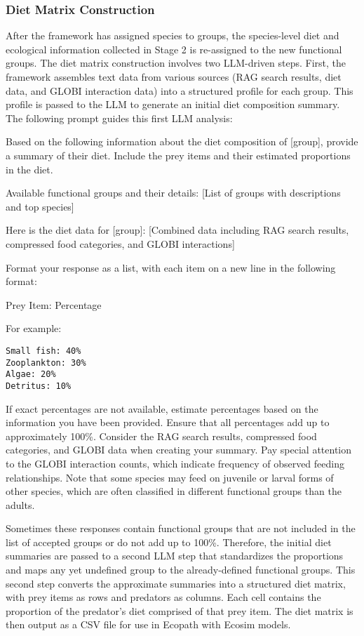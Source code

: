 \subsubsection{Diet Matrix Construction}

After the framework has assigned species to groups, the species-level diet and ecological information collected in Stage 2 is re-assigned to the new functional groups. The diet matrix construction involves two LLM-driven steps. First, the framework assembles text data from various sources (RAG search results, diet data, and GLOBI interaction data) into a structured profile for each group. This profile is passed to the LLM to generate an initial diet composition summary. The following prompt guides this first LLM analysis:

\begin{prompt}
Based on the following information about the diet composition of [group], provide a summary of their diet. Include the prey items and their estimated proportions in the diet.

Available functional groups and their details:
[List of groups with descriptions and top species]

Here is the diet data for [group]:
[Combined data including RAG search results, compressed food categories, and GLOBI interactions]

Format your response as a list, with each item on a new line in the following format:

Prey Item: Percentage

For example:
\begin{verbatim}
Small fish: 40%
Zooplankton: 30%
Algae: 20%
Detritus: 10%
\end{verbatim}

If exact percentages are not available, estimate percentages based on the information you have been provided.
Ensure that all percentages add up to approximately 100\%.
Consider the RAG search results, compressed food categories, and GLOBI data when creating your summary.
Pay special attention to the GLOBI interaction counts, which indicate frequency of observed feeding relationships.
Note that some species may feed on juvenile or larval forms of other species, which are often classified in different functional groups than the adults.
\end{prompt}

Sometimes these responses contain functional groups that are not included in the list of accepted groups or do not add up to 100\%. Therefore, the initial diet summaries are passed to a second LLM step that standardizes the proportions and maps any yet undefined group to the already-defined functional groups. This second step converts the approximate summaries into a structured diet matrix, with prey items as rows and predators as columns. Each cell contains the proportion of the predator's diet comprised of that prey item. The diet matrix is then output as a CSV file for use in Ecopath with Ecosim models. 

